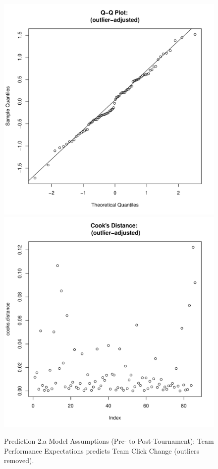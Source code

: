 \begin{CJK}{UTF8}{gbsn}
\begin{figure}[!htbp]
         \includegraphics[scale =.4]{images/MLM21bOutQQNorm.pdf}
         \includegraphics[scale =.4]{images/MLM21bOutCooksD.pdf}
         \caption{Prediction 2.a Model Assumptions (Pre- to Post-Tournament): Team Performance Expectations predicts Team Click Change (outliers removed).}
         \label{fig:MLM21bOutAssumptions}
       \end{figure}






\end{CJK}
